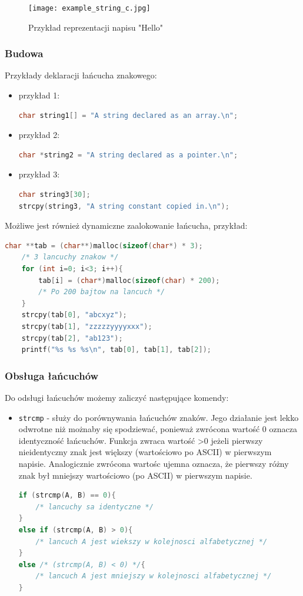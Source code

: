 \documentclass[a4paper,12pt,oneside]{book}
\begin{document}
				\begin{figure}[h!]
					\centering\texttt{[image: example\_string\_c.jpg]}
					\caption{Przykład reprezentacji napisu "Hello"}
				\end{figure}
			
				\subsubsection{Budowa}

					Przykłady deklaracji łańcucha znakowego:
					\begin{itemize}
						\item przykład 1:
						\begin{lstlisting}[language=C]
char string1[] = "A string declared as an array.\n";
						\end{lstlisting}
						\item przykład 2:
						\begin{lstlisting}[language=C]
char *string2 = "A string declared as a pointer.\n";	
						\end{lstlisting}
						\item przykład 3:
						\begin{lstlisting}[language=C]
char string3[30]; 
strcpy(string3, "A string constant copied in.\n");
						\end{lstlisting}
					\end{itemize}
					\newpage
					Możliwe jest również dynamiczne zaalokowanie łańcucha, przykład:
					\begin{lstlisting}[language=C]
	char **tab = (char**)malloc(sizeof(char*) * 3); 
	/* 3 lancuchy znakow */
	for (int i=0; i<3; i++){ 
	    tab[i] = (char*)malloc(sizeof(char) * 200);
	    /* Po 200 bajtow na lancuch */
	} 
	strcpy(tab[0], "abcxyz"); 
	strcpy(tab[1], "zzzzzyyyyxxx"); 
	strcpy(tab[2], "ab123"); 
	printf("%s %s %s\n", tab[0], tab[1], tab[2]); 
					\end{lstlisting}
			
				\subsubsection{Obsługa łańcuchów}
					Do odsługi łańcuchów możemy zaliczyć następujące komendy:
					\begin{itemize}
						\item \verb*|strcmp| - służy do porównywania łańcuchów znaków. Jego działanie jest lekko odwrotne niż możnaby się spodziewać, ponieważ zwrócona wartość 0 oznacza identyczność łańcuchów. Funkcja zwraca wartość >0 jeżeli pierwszy nieidentyczny znak jest większy (wartościowo po ASCII) w pierwszym napisie. Analogicznie zwrócona wartośc ujemna oznacza, że pierwszy różny znak był mniejszy wartościowo (po ASCII) w pierwszym napisie.
						\begin{lstlisting}[language=C]
if (strcmp(A, B) == 0){
    /* lancuchy sa identyczne */
}
else if (strcmp(A, B) > 0){
    /* lancuch A jest wiekszy w kolejnosci alfabetycznej */
}
else /* (strcmp(A, B) < 0) */{
    /* lancuch A jest mniejszy w kolejnosci alfabetycznej */
}
						\end{lstlisting}
					\end{itemize}
				
\end{document}
